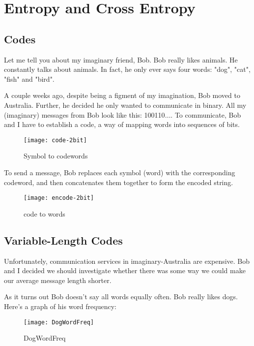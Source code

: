 \chapter{Entropy and Cross Entropy}
\section{Codes}
Let me tell you about my imaginary friend, Bob. Bob really likes animals. He constantly talks about animals.
In fact, he only ever says four words: "dog", "cat", "fish" and "bird".

A couple weeks ago, despite being a figment of my imagination, Bob moved to Australia.
Further, he decided he only wanted to communicate in binary. All my (imaginary) messages from Bob look like this: 100110$\ldots$.
To communicate, Bob and I have to establish a code, a way of mapping words into sequences of bits.

\begin{figure}[htbp]
  \centering
  \texttt{[image: code-2bit]}\\
  \caption{Symbol to codewords}\label{fig.entropy.word2code}
\end{figure}

To send a message, Bob replaces each symbol (word) with the corresponding codeword, and then concatenates them together to form the encoded string.

\begin{figure}[htbp]
  \centering
  \texttt{[image: encode-2bit]}\\
  \caption{code to words}\label{fig.entropy.code2word}
\end{figure}

\section{Variable-Length Codes}
Unfortunately, communication services in imaginary-Australia are expensive. 
Bob and I decided we should investigate whether there was some way we could make our average message length shorter.

As it turns out Bob doesn't say all words equally often. Bob really likes dogs. Here's a graph of his word frequency:

\begin{figure}[htbp]
  \centering
  \texttt{[image: DogWordFreq]}\\
  \caption{DogWordFreq}\label{fig.entropy.DogWordFreq}
\end{figure}


